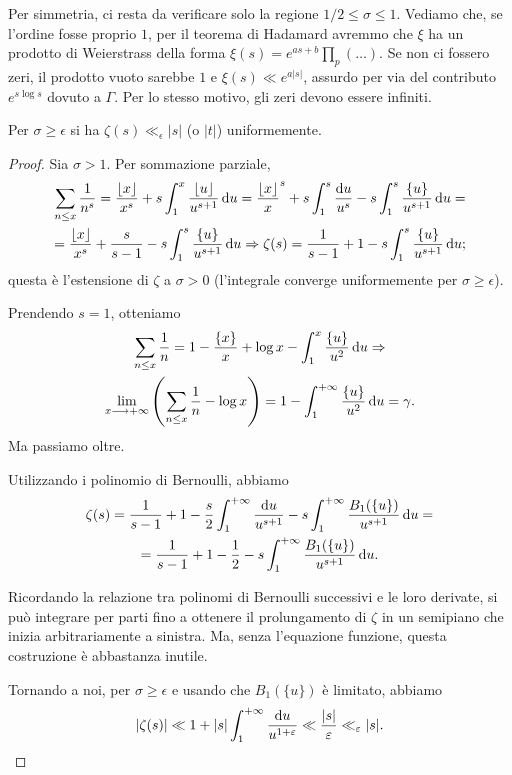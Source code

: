 Per simmetria, ci resta da verificare solo la regione $1/2 \le \sigma \le 1$. Vediamo che, se l'ordine fosse proprio $1$, per il teorema di Hadamard avremmo che $\xi$ ha un prodotto di Weierstrass della forma $\displaystyle \xi(s)=e^{as+b}\prod_p (\dots)$. Se non ci fossero zeri, il prodotto vuoto sarebbe $1$ e $\xi(s) \ll e^{a|s|}$, assurdo per via del contributo $e^{s\log{s}}$ dovuto a $\Gamma$. Per lo stesso motivo, gli zeri devono essere infiniti.

\begin{lm} \label{lls}
  Per $\sigma \ge \epsilon$ si ha $\zeta(s) \ll_{\epsilon} |s|$ (o $|t|$) uniformemente.
\end{lm}

\begin{proof}
  Sia $\sigma>1$. Per sommazione parziale,
  \begin{gather*}
    \sum_{n \le x} \frac{1}{n^s}=\frac{\lfloor x\rfloor}{x^s}+s\int_1^x \frac{\lfloor u\rfloor}{u^{s+1}}\mathop{}\!\mathrm{d} u=\frac{\lfloor x\rfloor}x^s+s\int_1^s \frac{\mathop{}\!\mathrm{d} u}{u^s}-s\int_1^s \frac{\{u\}}{u^{s+1}}\mathop{}\!\mathrm{d} u= \\
    =\frac{\lfloor x\rfloor}{x^s}+\frac{s}{s-1}-s\int_1^s \frac{\{u\}}{u^{s+1}}\mathop{}\!\mathrm{d} u \Rightarrow \zeta(s)=\frac{1}{s-1}+1-s\int_1^s \frac{\{u\}}{u^{s+1}}\mathop{}\!\mathrm{d} u;
  \end{gather*}
  questa è l'estensione di $\zeta$ a $\sigma>0$ (l'integrale converge uniformemente per $\sigma \ge \epsilon$).
  \begin{oss}
    Prendendo $s=1$, otteniamo
    \begin{gather*}
      \sum_{n \le x} \frac{1}{n}=1-\frac{\{x\}}{x}+\log{x}-\int_1^x \frac{\{u\}}{u^2}\mathop{}\!\mathrm{d} u \Rightarrow \\
      \lim_{x \longrightarrow +\infty} \left(\sum_{n \le x} \frac{1}{n}-\log{x}\right)=1-\int_1^{+\infty} \frac{\{u\}}{u^2}\mathop{}\!\mathrm{d} u=\gamma.
    \end{gather*}
    Ma passiamo oltre.
  \end{oss}

  Utilizzando i polinomio di Bernoulli, abbiamo
  \begin{gather*}
    \zeta(s)=\frac{1}{s-1}+1-\frac{s}{2}\int_1^{+\infty} \frac{\mathop{}\!\mathrm{d} u}{u^{s+1}}-s\int_1^{+\infty} \frac{B_1(\{u\})}{u^{s+1}}\mathop{}\!\mathrm{d} u= \\
    =\frac{1}{s-1}+1-\frac{1}{2}-s\int_1^{+\infty} \frac{B_1(\{u\})}{u^{s+1}}\mathop{}\!\mathrm{d} u.
  \end{gather*}

  \begin{oss}
    Ricordando la relazione tra polinomi di Bernoulli successivi e le loro derivate, si può integrare per parti fino a ottenere il prolungamento di $\zeta$ in un semipiano che inizia arbitrariamente a sinistra. Ma, senza l'equazione funzione, questa costruzione è abbastanza inutile.
  \end{oss}

  Tornando a noi, per $\sigma \ge \epsilon$ e usando che $B_1(\{u\})$ è limitato, abbiamo
  $$|\zeta(s)| \ll 1+|s|\int_1^{+\infty} \frac{\mathop{}\!\mathrm{d} u}{u^{1+\varepsilon}} \ll \frac{|s|}{\varepsilon} \ll_{\varepsilon} |s|.$$
\end{proof}

